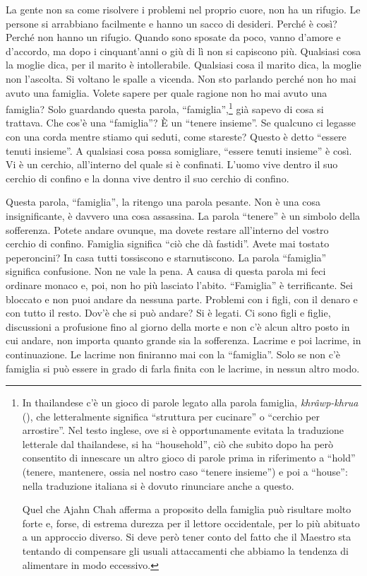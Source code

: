 La gente non sa come risolvere i problemi nel proprio cuore, non ha un
rifugio. Le persone si arrabbiano facilmente e hanno un sacco di
desideri. Perché è così? Perché non hanno un rifugio. Quando sono
sposate da poco, vanno d'amore e d'accordo, ma dopo i cinquant'anni o
giù di lì non si capiscono più. Qualsiasi cosa la moglie dica, per il
marito è intollerabile. Qualsiasi cosa il marito dica, la moglie non
l'ascolta. Si voltano le spalle a vicenda. Non sto parlando perché non
ho mai avuto una famiglia. Volete sapere per quale ragione non ho mai
avuto una famiglia? Solo guardando questa parola,
``famiglia'',\footnote{In thailandese c'è un gioco di parole legato alla
  parola famiglia, \emph{khrâwp-khrua} (), che letteralmente
  significa ``struttura per cucinare'' o ``cerchio per arrostire''. Nel
  testo inglese, ove si è opportunamente evitata la traduzione letterale
  dal thailandese, si ha ``household'', ciò che subito dopo ha però
  consentito di innescare un altro gioco di parole prima in riferimento
  a ``hold'' (tenere, mantenere, ossia nel nostro caso ``tenere
  insieme'') e poi a ``house'': nella traduzione italiana si è dovuto
  rinunciare anche a questo.

  Quel che Ajahn Chah afferma a proposito della famiglia può risultare
  molto forte e, forse, di estrema durezza per il lettore occidentale,
  per lo più abituato a un approccio diverso. Si deve però tener conto
  del fatto che il Maestro sta tentando di compensare gli usuali
  attaccamenti che abbiamo la tendenza di alimentare in modo eccessivo.}
già sapevo di cosa si trattava. Che cos'è una ``famiglia''? È un
``tenere insieme''. Se qualcuno ci legasse con una corda mentre stiamo
qui seduti, come stareste? Questo è detto ``essere tenuti insieme''. A
qualsiasi cosa possa somigliare, ``essere tenuti insieme'' è così. Vi è
un cerchio, all'interno del quale si è confinati. L'uomo vive dentro il
suo cerchio di confino e la donna vive dentro il suo cerchio di confino.

Questa parola, ``famiglia'', la ritengo una parola pesante. Non è una
cosa insignificante, è davvero una cosa assassina. La parola ``tenere''
è un simbolo della sofferenza. Potete andare ovunque, ma dovete restare
all'interno del vostro cerchio di confino. Famiglia significa ``ciò che
dà fastidi''. Avete mai tostato peperoncini? In casa tutti tossiscono e
starnutiscono. La parola ``famiglia'' significa confusione. Non ne vale
la pena. A causa di questa parola mi feci ordinare monaco e, poi, non ho
più lasciato l'abito. ``Famiglia'' è terrificante. Sei bloccato e non
puoi andare da nessuna parte. Problemi con i figli, con il denaro e con
tutto il resto. Dov'è che si può andare? Si è legati. Ci sono figli e
figlie, discussioni a profusione fino al giorno della morte e non c'è
alcun altro posto in cui andare, non importa quanto grande sia la
sofferenza. Lacrime e poi lacrime, in continuazione. Le lacrime non
finiranno mai con la ``famiglia''. Solo se non c'è famiglia si può
essere in grado di farla finita con le lacrime, in nessun altro modo.

